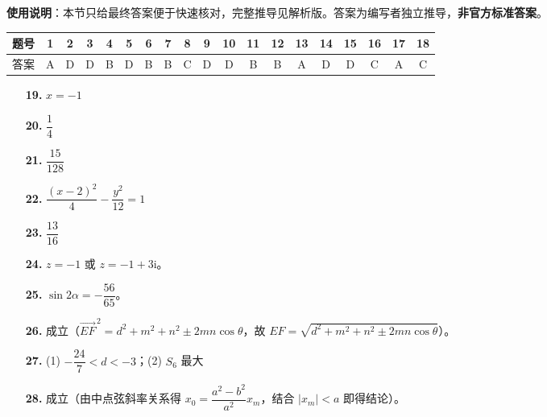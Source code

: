 
\begin{gknotice}
\textbf{使用说明}：本节只给最终答案便于快速核对，完整推导见解析版。答案为编写者独立推导，\textbf{非官方标准答案}。
\end{gknotice}

\begin{center}\begin{tabular}{ccccccccccccccccccc}
\toprule
题号 & 1 & 2 & 3 & 4 & 5 & 6 & 7 & 8 & 9 & 10 & 11 & 12 & 13 & 14 & 15 & 16 & 17 & 18 \\
\midrule
答案 & A & D & D & B & D & B & B & C & D & D & B & B & A & D & D & C & A & C \\
\bottomrule
\end{tabular}\end{center}

\begin{itemize}[leftmargin=2.6em]
  \item[\textbf{19.}] \(x=-1\)
  \item[\textbf{20.}] \(\dfrac14\)
  \item[\textbf{21.}] \(\dfrac{15}{128}\)
  \item[\textbf{22.}] \(\dfrac{(x-2)^2}{4}-\dfrac{y^2}{12}=1\)
  \item[\textbf{23.}] \(\dfrac{13}{16}\)
\end{itemize}

\begin{itemize}[leftmargin=2.6em]
  \item[\textbf{24.}] \(z=-1\) 或 \(z=-1+3\mathrm{i}\)。
  \item[\textbf{25.}] \(\sin 2\alpha=-\dfrac{56}{65}\)。
  \item[\textbf{26.}] 成立（\(\overrightarrow{EF}^{\,2}=d^{2}+m^{2}+n^{2}\pm2mn\cos\theta\)，故 \(EF=\sqrt{d^{2}+m^{2}+n^{2}\pm2mn\cos\theta}\)）。
  \item[\textbf{27.}] (1) \(-\dfrac{24}{7}<d<-3\)；(2) \(S_6\) 最大
  \item[\textbf{28.}] 成立（由中点弦斜率关系得 \(x_0=\dfrac{a^{2}-b^{2}}{a^{2}}x_m\)，结合 \(|x_m|<a\) 即得结论）。
\end{itemize}
